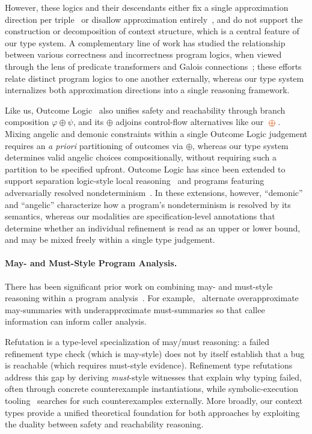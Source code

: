 However, these logics and their descendants either fix a single
approximation direction per triple~\cite{ReverseHoareLogic, OHP19,
  RBD+20} or disallow approximation entirely~\cite{ESL+23}, and do not
support the construction or decomposition of context structure, which
is a central feature of our type system. A complementary line of work
has studied the relationship between various correctness and
incorrectness program logics, when viewed through the lens of
predicate transformers and Galois connections~\cite{Cousot+24, VK+25};
these efforts relate distinct program logics to one another
externally, whereas our type system internalizes both approximation
directions into a single reasoning framework.

Like us, Outcome Logic~\cite{ZDS23, Zil25TOPLAS} also unifies safety
and reachability through branch composition $\varphi \oplus \psi$, and
its $\oplus$ adjoins control-flow alternatives like our $\ctoplus$.
Mixing angelic and demonic constraints within a single Outcome
Logic judgement requires an \emph{a priori} partitioning of outcomes
via $\oplus$, whereas our type system determines valid angelic choices
compositionally, without requiring such a partition to be specified
upfront. Outcome Logic has since been extended to support
separation logic-style local reasoning~\cite{ZSS+24} and programs
featuring adversarially resolved nondeterminism~\cite{ZKST+25}. In
these extensions, however, ``demonic'' and ``angelic'' characterize
how a program's nondeterminism is resolved by its semantics, whereas
our modalities are specification-level annotations that determine
whether an individual refinement is read as an upper or lower bound,
and may be mixed freely within a single type judgement.

\paragraph{May- and Must-Style Program Analysis.}
There has been significant prior work on combining may- and must-style
reasoning within a program analysis~\cite{GHK+06,GN+10,NYC+12,BVR+08}.
For example,~\citet{GN+10} alternate overapproximate may-summaries
with underapproximate must-summaries so that callee information can
inform caller analysis.

Refutation is a type-level specialization of may/must reasoning: a
failed refinement type check (which is may-style) does not by itself
establish that a bug is reachable (which requires must-style
evidence).  Refinement type
refutations~\cite{RefinementTypeRefutations} address this gap by
deriving \emph{must}-style witnesses that explain why typing failed,
often through concrete counterexample instantiations, while
symbolic-execution tooling~\cite{RefinementTypeSymbolicExecution}
searches for such counterexamples externally.  More broadly, our
context types provide a unified theoretical foundation for both
approaches by exploiting the duality between safety and reachability
reasoning.

